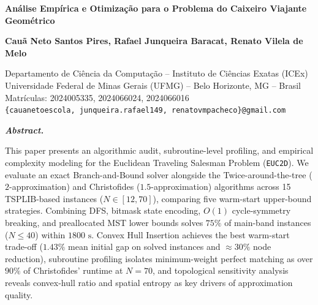 \documentclass[12pt,a4paper]{article}
\newenvironment{sbcabstract}{%
    \begin{list}{}{%
        \setlength{\leftmargin}{0.8cm}%
        \setlength{\rightmargin}{0.8cm}%
        \setlength{\listparindent}{0pt}%
        \setlength{\itemindent}{0pt}%
        \setlength{\parsep}{0pt}%
        \setlength{\topsep}{6pt}%
    }%
    \item\relax\itshape\noindent\textbf{Abstract.}\hspace{0.4em}\ignorespaces
}{\end{list}}
\renewcommand{\_}{\origunderscore\hspace{0pt}}
\begin{document}
\begin{center}
    {\fontsize{16}{19}\selectfont\bfseries Análise Empírica e Otimização para o Problema do Caixeiro Viajante Geométrico\par}
    \vspace{12pt}
    {\fontsize{12}{15}\selectfont\bfseries Cauã Neto Santos Pires, Rafael Junqueira Baracat, Renato Vilela de Melo\par}
    \vspace{6pt}
    {\small
    Departamento de Ciência da Computação -- Instituto de Ciências Exatas (ICEx)\\
    Universidade Federal de Minas Gerais (UFMG) -- Belo Horizonte, MG -- Brasil\\
    Matrículas: 2024005335, 2024066024, 2024066016\\
    \texttt{\{cauanetoescola, junqueira.rafael149, renatovmpacheco\}@gmail.com}\par}
\end{center}
\vspace{6pt}

\begin{sbcabstract}
This paper presents an algorithmic audit, subroutine-level profiling, and empirical complexity modeling for the Euclidean Traveling Salesman Problem (\texttt{EUC\_2D}). We evaluate an exact Branch-and-Bound solver alongside the \textup{Twice-around-the-tree} ($2$-approximation) and \textup{Christofides} ($1.5$-approximation) algorithms across 15 TSPLIB-based instances ($N \in [12, 70]$), comparing five warm-start upper-bound strategies. Combining DFS, bitmask state encoding, $O(1)$ cycle-symmetry breaking, and preallocated MST lower bounds solves $75\%$ of main-band instances ($N \le 40$) within $1800\text{ s}$. Convex Hull Insertion achieves the best warm-start trade-off ($1.43\%$ mean initial gap on solved instances and $\approx 30\%$ node reduction), subroutine profiling isolates minimum-weight perfect matching as over $90\%$ of Christofides' runtime at $N=70$, and topological sensitivity analysis reveals convex-hull ratio and spatial entropy as key drivers of approximation quality.
\end{sbcabstract}
\end{document}
